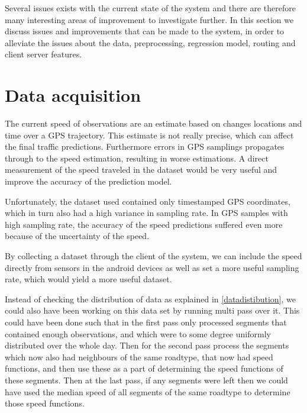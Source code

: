Several issues exists with the current state of the system and there are therefore many interesting areas of improvement to investigate further. In this section we discuss issues and improvements that can be made to the system, in order to alleviate the issues about the data, preprocessing, regression model, routing and client server features.

\section{Data acquisition}
The current speed of observations are an estimate based on changes locations and time over a GPS trajectory. This estimate is not really precise, which can affect the final traffic predictions. Furthermore errors in GPS samplings propagates through to the speed estimation, resulting in worse estimations. A direct measurement of the speed traveled in the dataset would be very useful and improve the accuracy of the prediction model.
 
Unfortunately, the dataset used contained only timestamped GPS coordinates, which in turn also had a high variance in sampling rate. In GPS samples with high sampling rate, the accuracy of the speed predictions suffered even more because of the uncertainty of the speed.

By collecting a dataset through the client of the system, we can include the speed directly from sensors in the android devices as well as set a more useful sampling rate, which would yield a more useful dataset.

Instead of checking the distribution of data as explained in \ref{datadistibution}, we could also have been working on this data set by running multi pass over it. This could have been done such that in the first pass only processed segments that contained enough observations, and which were to some degree uniformly distributed over the whole day. Then for the second pass process the segments which now also had neighbours of the same roadtype, that now had speed functions, and then use these as a part of determining the speed functions of these segments. Then at the last pass, if any segments were left then we could have used the median speed of all segments of the same roadtype to determine those speed functions.

